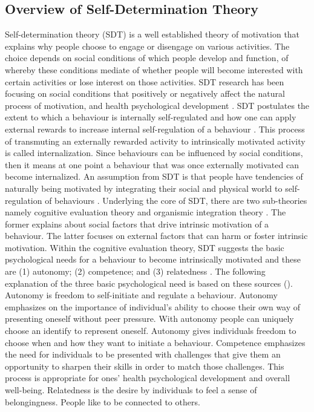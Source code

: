 \documentclass{sig-alternate}
\begin{document}
\subsection{Overview of Self-Determination Theory}
Self-determination theory (SDT) is a well established theory of motivation that explains why people choose to engage or disengage on various activities. The choice depends on social conditions of which people develop and function, of whereby these conditions mediate of whether people will become interested with certain activities or lose interest on those activities. SDT research has been focusing on social conditions that positively or negatively affect the natural process of motivation, and health psychological development \cite{ryan2000:self}. SDT postulates the extent to which a behaviour is internally self-regulated and how one can apply external rewards to increase internal self-regulation of a behaviour \cite{ryan2000:self}. This process of transmuting an externally rewarded activity to intrinsically motivated activity is called internalization. Since behaviours can be influenced by social conditions, then it means at one point a behaviour that was once externally motivated can become internalized.\newline
An assumption from SDT is that people have tendencies of naturally being motivated by integrating their social and physical world to self-regulation of behaviours \cite{lee2015:relating}. Underlying the core of SDT, there are two sub-theories namely cognitive evaluation theory and organismic integration theory \cite{ryan2000:self}. The former explains about social factors that drive intrinsic motivation of a behaviour. The latter focuses on external factors that can harm or foster intrinsic motivation.\newline  
Within the cognitive evaluation theory, SDT suggests the basic psychological needs for a behaviour to become intrinsically motivated and these are (1) autonomy; (2) competence; and (3) relatedness \cite{deci1985:intrinsic}.\newline
The following explanation of the three basic psychological need is based on these sources (\cite{deci1985:intrinsic,ryan2000:self,lee2015:relating}). Autonomy is freedom to self-initiate and regulate a behaviour. Autonomy emphasizes on the importance of individual's ability to choose their own way of presenting oneself without peer pressure. With autonomy people can uniquely choose an identify to represent oneself. Autonomy gives individuals freedom to choose when and how they want to initiate a behaviour. Competence emphasizes the need for individuals to be presented with challenges that give them an opportunity to sharpen their skills in order to match those challenges. This process is appropriate for ones' health psychological development and  overall well-being\cite{zhang2008:motivational}. Relatedness is the desire by individuals to feel a sense of belongingness. People like to be connected to others. \newline  
\end{document}
